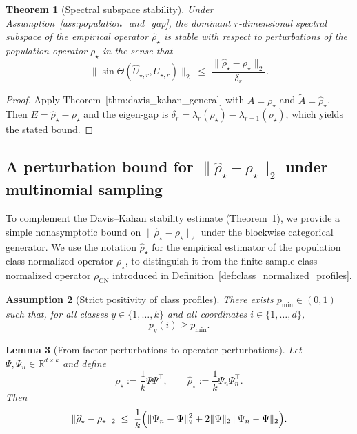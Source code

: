 \documentclass[preprint,11pt]{elsarticle}
\newtheorem{Theorem}{Theorem}[section]
\newtheorem{Assumption}[Theorem]{Assumption}
\newtheorem{Lemma}[Theorem]{Lemma}
\newcommand{\R}{\mathbb{R}}
\begin{document}
\begin{Theorem}[Spectral subspace stability]
\label{thm:davis_kahan_stability}
Under Assumption~\ref{ass:population_and_gap}, the dominant $r$-dimensional spectral subspace of the empirical operator
$\widehat\rho_\star$ is stable with respect to perturbations of the population operator $\rho_\star$ in the sense that
\[
\bigl\|\sin\Theta(\widehat U_{\star,r},U_{\star,r})\bigr\|_2
\;\le\;
\frac{\|\widehat\rho_\star-\rho_\star\|_2}{\delta_r}.
\]
\end{Theorem}

\begin{proof}
Apply Theorem~\ref{thm:davis_kahan_general} with $A=\rho_\star$ and $\widetilde A=\widehat\rho_\star$.
Then $E=\widehat\rho_\star-\rho_\star$ and the eigen-gap is $\delta_r=\lambda_r(\rho_\star)-\lambda_{r+1}(\rho_\star)$,
which yields the stated bound.
\end{proof}

\subsection{A perturbation bound for \texorpdfstring{$\|\widehat\rho_\star-\rho_\star\|_2$}{||rhohatstar-rhostar||2} under multinomial sampling}
\label{subsec:perturbation_bound}

To complement the Davis--Kahan stability estimate (Theorem~\ref{thm:davis_kahan_stability}), we provide a simple nonasymptotic bound on
$\|\widehat\rho_\star-\rho_\star\|_2$ under the blockwise categorical generator. We use the notation $\widehat\rho_\star$ for the empirical estimator
of the population class-normalized operator $\rho_\star$, to distinguish it from the finite-sample class-normalized operator
$\rho_{\mathrm{CN}}$ introduced in Definition~\ref{def:class_normalized_profiles}.

\begin{Assumption}[Strict positivity of class profiles]
\label{ass:positivity_profiles}
There exists $p_{\min}\in(0,1)$ such that, for all classes $y\in\{1,\dots,k\}$ and all coordinates $i\in\{1,\dots,d\}$,
\[
p_y(i)\ge p_{\min}.
\]
\end{Assumption}

\begin{Lemma}[From factor perturbations to operator perturbations]
\label{lem:rho_lipschitz_in_psi}
Let $\Psi,\Psi_n\in\R^{d\times k}$ and define
\[
\rho_\star:=\frac{1}{k}\Psi\Psi^\top,\qquad \widehat\rho_\star:=\frac{1}{k}\Psi_n\Psi_n^\top.
\]
Then
\[
\|\widehat\rho_\star-\rho_\star\|_2
\;\le\;
\frac{1}{k}\Bigl( \|\Psi_n-\Psi\|_2^2 + 2\|\Psi\|_2\,\|\Psi_n-\Psi\|_2 \Bigr).
\]
\end{Lemma}
\end{document}
